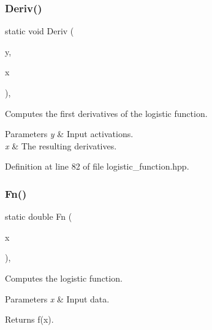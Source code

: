 \subsubsection{Deriv()\hspace{0.1cm}{\footnotesize\ttfamily [2/2]}}
{\footnotesize\ttfamily static void Deriv (\begin{DoxyParamCaption}\item[{const Input\+Vec\+Type \&}]{y,  }\item[{Output\+Vec\+Type \&}]{x }\end{DoxyParamCaption})\hspace{0.3cm}{\ttfamily [inline]}, {\ttfamily [static]}}



Computes the first derivatives of the logistic function. 


\begin{DoxyParams}{Parameters}
{\em y} & Input activations. \\
\hline
{\em x} & The resulting derivatives. \\
\hline
\end{DoxyParams}


Definition at line 82 of file logistic\+\_\+function.\+hpp.

\mbox{\label{classmlpack_1_1ann_1_1LogisticFunction_a7be90336227c4673a4152dbac3d62c25}} 
\subsubsection{Fn()\hspace{0.1cm}{\footnotesize\ttfamily [1/2]}}
{\footnotesize\ttfamily static double Fn (\begin{DoxyParamCaption}\item[{const eT}]{x }\end{DoxyParamCaption})\hspace{0.3cm}{\ttfamily [inline]}, {\ttfamily [static]}}



Computes the logistic function. 


\begin{DoxyParams}{Parameters}
{\em x} & Input data. \\
\hline
\end{DoxyParams}
\begin{DoxyReturn}{Returns}
f(x). 
\end{DoxyReturn}


